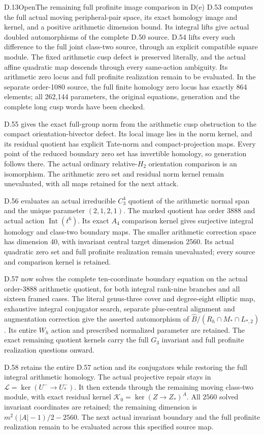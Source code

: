 \begin{statement}{D.13}{Open}{The remaining full profinite image comparison in D(e)}
D.53 computes the full actual moving peripheral-pair space,
its exact homology image and kernel, and a positive arithmetic
dimension bound. Its integral lifts give actual doubled
automorphisms of the complete D.50 source. D.54 lifts every
such difference to the full joint class-two source, through
an explicit compatible square module. The fixed arithmetic
cusp defect is preserved literally, and the actual affine
quadratic map descends through every same-action ambiguity.
Its arithmetic zero locus and full profinite realization
remain to be evaluated. In the separate order-1080 source,
the full finite homology zero locus has exactly 864 elements;
all 262,144 parameters, the original equations, generation
and the complete long cusp words have been checked.


D.55 gives the exact full-group norm from the arithmetic
cusp obstruction to the compact orientation-bivector defect.
Its local image lies in the norm kernel, and its residual
quotient has explicit Tate-norm and compact-projection maps.
Every point of the reduced boundary zero set has invertible
homology, so generation follows there. The actual ordinary
relative-$H_2$ orientation comparison is an isomorphism.
The arithmetic zero set and residual norm kernel remain
unevaluated, with all maps retained for the next attack.


D.56 evaluates an actual irreducible $C_3^4$ quotient of
the arithmetic normal span and the unique parameter $(2,1,2,1)$.
The marked quotient has order 3888 and actual action
$\operatorname{Int}(t^6)$. Its exact $A_4$ comparison kernel
gives surjective integral homology and class-two boundary maps.
The smaller arithmetic correction space has dimension 40,
with invariant central target dimension 2560. Its actual
quadratic zero set and full profinite realization remain
unevaluated; every source and comparison kernel is retained.


D.57 now solves the complete ten-coordinate boundary equation
on the actual order-$3888$ arithmetic quotient, for both integral
rank-nine branches and all sixteen framed cases. The literal
genus-three cover and degree-eight elliptic map, exhaustive integral
conjugator search, separate plus-central alignment and augmentation
correction give the asserted automorphism of
$\widehat B/(R_h\cap M_*\cap L_{*,2})$.
Its entire $W_h$ action and prescribed normalized parameter are
retained. The exact remaining quotient kernels carry the full
$G_3$ invariant and full profinite realization questions onward.


D.58 retains the entire D.57 action and its conjugators while
restoring the full integral arithmetic homology. The actual
projective repair stays in
$\mathcal L=\ker(U^-\to U_*^-)$.
It then extends through the remaining moving class-two module,
with exact residual kernel
$\mathcal K_0=\ker(Z\to Z_*)^A$.
All $2560$ solved invariant coordinates are retained; the remaining
dimension is $m^2(|A|-1)/2-2560$.
The next actual invariant boundary and the full profinite realization
remain to be evaluated across this specified source map.



\end{statement}
